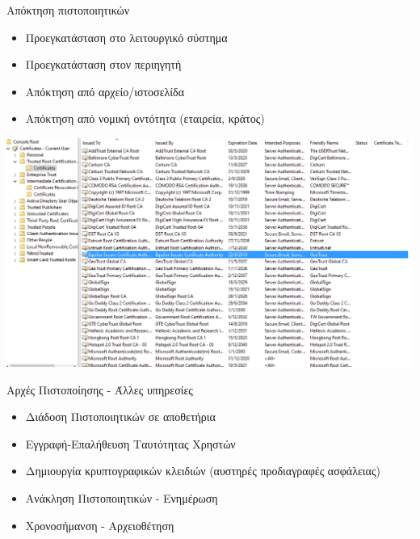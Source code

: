 \documentclass{beamer}
\begin{document}
\begin{frame}{Απόκτηση πιστοποιητικών}
\begin{itemize}
\item Προεγκατάσταση στο λειτουργικό σύστημα
\pause
\item Προεγκατάσταση στον περιηγητή
\pause
\item Απόκτηση από αρχείο/ιστοσελίδα
\pause
\item Απόκτηση από νομική οντότητα (εταιρεία, κράτος)
\pause
\end{itemize}
  \begin{center}
    \includegraphics[scale=0.3]{certificates.PNG}
    \end{center} 
\end{frame}

\begin{frame}{Αρχές Πιστοποίησης - Άλλες υπηρεσίες}
    \begin{itemize}
        \item  Διάδοση Πιστοποιητικών σε αποθετήρια
        \pause
        \item  Εγγραφή-Επαλήθευση Ταυτότητας Χρηστών 
        \pause
        \item  Δημιουργία κρυπτογραφικών κλειδιών (αυστηρές προδιαγραφές ασφάλειας)
        \pause
        \item  Ανάκληση Πιστοποιητικών - Ενημέρωση
        \pause
        \item  Χρονοσήμανση - Αρχειοθέτηση
    \end{itemize}
\end{frame}
\end{document}
